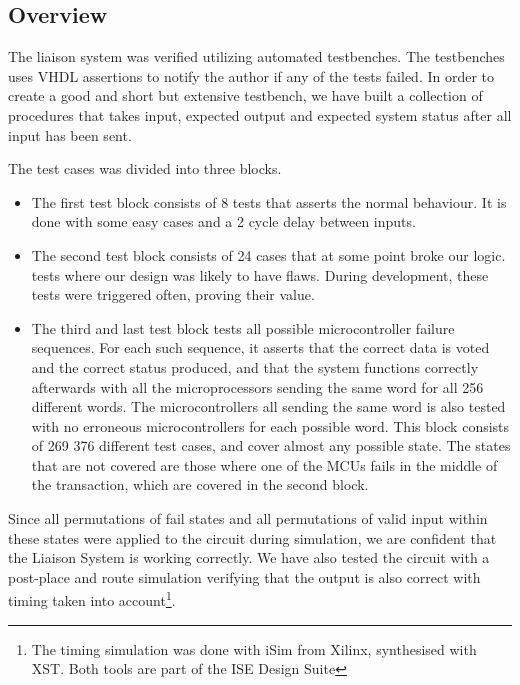 \subsection{Overview}
The liaison system was verified utilizing automated testbenches. The testbenches uses VHDL assertions to notify the author if any
of the tests failed. In order to create a good and short but extensive testbench, we have built a collection of procedures that takes input, expected output
and expected system status after all input has been sent.

The test cases was divided into three blocks.
\begin{itemize}
\item The first test block consists of 8 tests that asserts the normal behaviour. It is done with some easy cases and a 2 cycle delay between inputs.

\item The second test block consists of 24 cases that at some point broke our logic.  tests where our design was likely to have flaws. During development, these tests were
triggered often, proving their value.

\item The third and last test block tests all possible microcontroller
  failure sequences. For each such sequence, it asserts that the
  correct data is voted and the correct status produced, and that the
  system functions correctly afterwards with all the microprocessors
  sending the same word for all 256 different words. The
  microcontrollers all sending the same word is also tested with no
  erroneous microcontrollers for each possible word. This block
  consists of 269 376 different test cases, and cover almost any
  possible state. The states that are not covered are those where one
  of the MCUs fails in the middle of the transaction, which are
  covered in the second block.
\end{itemize}

Since all permutations of fail states and all permutations of valid input within these states
were applied to the circuit during simulation, we are confident that the Liaison System is working correctly. We have also tested the circuit with a post-place and route
simulation verifying that the output is also correct with timing taken into account\footnote{The timing simulation was done with iSim from Xilinx, synthesised with XST. Both tools are part of the ISE Design Suite}.

